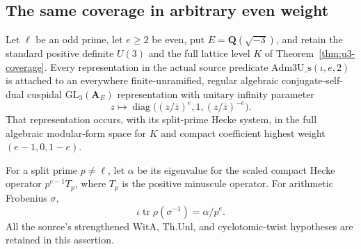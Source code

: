 \subsection{The same coverage in arbitrary even weight}
\label{sec:u3-general-coverage}

\begin{corollary}
\label{cor:u3-general-coverage}
Let $\ell$ be an odd prime, let $e\ge2$ be even, put
$E=\mathbf Q(\sqrt{-3})$, and retain the standard
positive definite $U(3)$ and the full lattice level $K$ of
Theorem~\ref{thm:u3-coverage}. Every representation in the actual source
predicate $\mathrm{Adm3U\_s}(\iota,e,2)$ is attached to an everywhere
finite-unramified, regular algebraic conjugate-self-dual cuspidal
$\mathrm{GL}_3(\mathbf A_E)$ representation with unitary infinity
parameter
\[
 z\longmapsto
 \operatorname{diag}\bigl((z/\bar z)^e,1,(z/\bar z)^{-e}\bigr).
\]
That representation occurs, with its split-prime Hecke system, in the
full algebraic modular-form space for $K$ and compact coefficient
highest weight $(e-1,0,1-e)$.

For a split prime $p\ne\ell$, let $\alpha$ be its eigenvalue for the
scaled compact Hecke operator $p^{e-1}T_p$, where $T_p$ is the positive
minuscule operator. For arithmetic Frobenius $\sigma$,
\[
 \iota\operatorname{tr}\rho(\sigma^{-1})=\alpha/p^e.
 \tag{U1}
\]
All the source's strengthened $\mathrm{WitA}$, $\mathrm{Th.Unl}$, and
cyclotomic-twist hypotheses are retained in this assertion.
\end{corollary}

